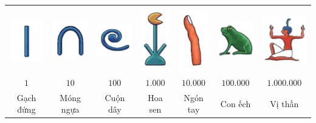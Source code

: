 	\begin{table}[H]
		\setlength{\tabcolsep}{5.05pt}
		\renewcommand{\arraystretch}{1.25}
		\centering
		\begin{tabular}{|c|c|c|c|c|c|c|}
			\hline
			& & & & & & \\[-3ex]
			\includegraphics[scale=1]{2a}&\includegraphics[scale=1]{2b}&\includegraphics[scale=1]{2c}&\includegraphics[scale=0.9]{2d}&\includegraphics[scale=1]{2e}&\includegraphics[scale=1]{2f}&\includegraphics[scale=1]{2g}\\
			\hline
			$1$&$10$ &$100$&$1{.}000$&$10{.}000$&$100{.}000$&$1{.}000{.}000$\\
			\hline
			{Gạch đứng}&{Móng ngựa}&{Cuộn dây}&{Hoa sen}&{Ngón tay}&{Con ếch}&{Vị thần}\\
			\hline
		\end{tabular}
		\vspace*{-5pt}
	\end{table}
